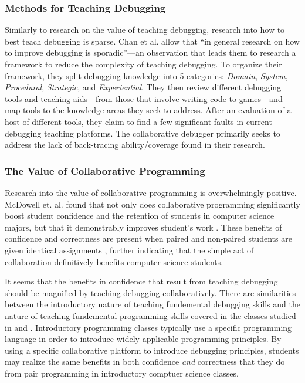 \documentclass[12pt]{article}
\begin{document}
\subsubsection{Methods for Teaching Debugging}

Similarly to research on the value of teaching debugging, research
into how to best teach debugging is sparse.  Chan et al. allow that
``in general research on how to improve debugging is sporadic''---an
observation that leads them to research a framework to reduce the
complexity of teaching debugging\cite{10.1145/3286960.3286970}.  To
organize their framework, they split debugging knowledge into 5
categories: \textit{Domain}, \textit{System}, \textit{Procedural},
\textit{Strategic}, and \textit{Experiential}.  They then review
different debugging tools and teaching aids---from those that involve
writing code to games---and map tools to the knowledge areas they seek
to address.  After an evaluation of a host of different tools, they
claim to find a few significant faults in current debugging teaching
platforms.  The collaborative debugger primarily seeks to address the
lack of back-tracing ability/coverage found in their research.

\subsubsection{The Value of Collaborative Programming}

Research into the value of collaborative programming is overwhelmingly
positive.  McDowell et. al. found that not only does collaborative
programming significantly boost student confidence and the retention
of students in computer science majors, but that it demonstrably
improves student's work \cite{10.1145/1145287.1145293}.  These
benefits of confidence and correctness are present when paired and
non-paired students are given identical assignments
\cite{10.1145/1026487.1008043}, further indicating that the simple act
of collaboration definitively benefits computer science students.
\par

It seems that the benefits in confidence that result from teaching
debugging should be magnified by teaching debugging collaboratively.
There are similarities between the introductory nature of teaching
fundemental debugging skills and the nature of teaching fundemental
programming skills covered in the classes studied in
\cite{10.1145/1026487.1008043} and \cite{10.1145/1145287.1145293}.
Introductory programming classes typically use a specific programming
language in order to introduce widely applicable programming
principles.  By using a specific collaborative platform to introduce
debugging principles, students may realize the same benefits in both
confidence \textit{and} correctness that they do from pair programming
in introductory comptuer science classes.
\par
\end{document}
